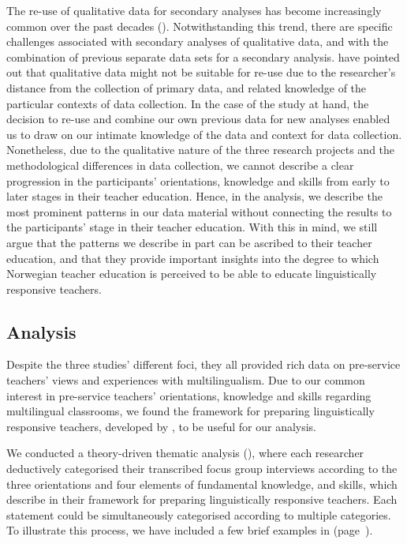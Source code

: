 \documentclass[output=paper]{langscibook}
\begin{document}
The re-use of qualitative data for secondary analyses has become increasingly common over the past decades (\citealt{BishopKuula-Luumi2017}). Notwithstanding this trend, there are specific challenges associated with secondary analyses of qualitative data, and with the combination of previous separate data sets for a secondary analysis. \citet{IrwinWinterton2011} have pointed out that qualitative data might not be suitable for re-use due to the researcher’s distance from the collection of primary data, and related knowledge of the particular contexts of data collection. In the case of the study at hand, the decision to re-use and combine our own previous data for new analyses enabled us to draw on our intimate knowledge of the data and context for data collection. Nonetheless, due to the qualitative nature of the three research projects and the methodological differences in data collection, we cannot describe a clear progression in the participants’ orientations, knowledge and skills from early to later stages in their teacher education. Hence, in the analysis, we describe the most prominent patterns in our data material without connecting the results to the participants' stage in their teacher education. With this in mind, we still argue that the patterns we describe in part can be ascribed to their teacher education, and that they provide important insights into the degree to which Norwegian teacher education is perceived to be able to educate linguistically responsive teachers.

\subsection{Analysis}

Despite the three studies’ different foci, they all provided rich data on pre-service teachers’ views and experiences with multilingualism. Due to our common interest in pre-service teachers’ orientations, knowledge and skills regarding multilingual classrooms, we found the framework for preparing linguistically responsive teachers, developed by \citet{LucasVillegas2011,Lucas2013}, to be useful for our analysis. 

We conducted a theory-driven thematic analysis (\citealt{BrinkmannKvale2015}), where each researcher deductively categorised their transcribed focus group interviews according to the three orientations and four elements of fundamental knowledge, and skills, which \citet{LucasVillegas2011} describe in their framework for preparing linguistically responsive teachers. Each statement could be simultaneously categorised according to multiple categories. To illustrate this process, we have included a few brief examples in  (page~\pageref{tab:iversen:2}).
\end{document}
